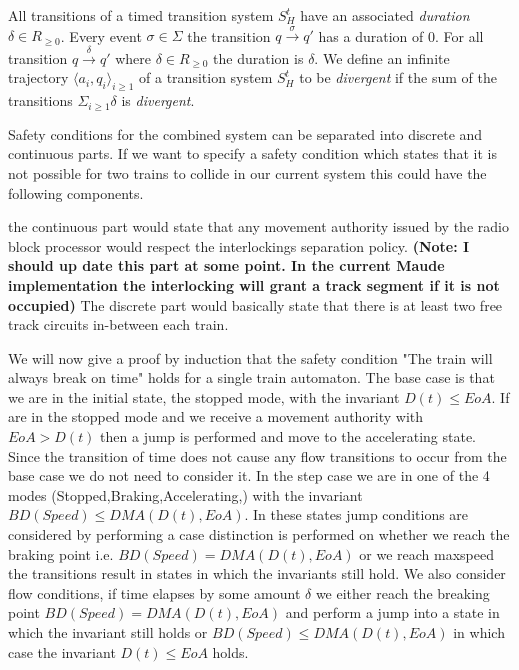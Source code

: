 \begin{mydef}
All transitions of a timed transition system $S^t_H$ have an associated \emph{duration} $\delta \in R_{\geq 0}$. Every event $\sigma \in \Sigma$ the transition $q \xrightarrow{\sigma} q'$ has a duration of 0. For all transition $q \xrightarrow{\delta} q'$ where $\delta \in R_{\geq 0}$ the duration is $\delta$.  We define an infinite trajectory $\langle a_i, q_i \rangle_{i \geq 1}$ of a transition system $S^t_H$ to be \emph{divergent} if the sum of the transitions $\Sigma_{i \geq 1} \delta$ is \emph{divergent}.
 \end{mydef}

Safety conditions for the combined system can be separated into discrete and continuous parts.  If we want to specify a safety condition which states that it is not possible for two trains to collide in our current system this could have the following components. 

the continuous part would state that any movement authority issued by the radio block processor would respect the interlockings separation policy. \textbf{(Note: I should up date this part at some point. In the current Maude implementation the interlocking will grant a track segment if it is not occupied)} The discrete part would basically state that there is at least two free track circuits in-between each train.


We will now give a proof by induction that the safety condition "The train will always break on time" holds for a single train automaton.
The base case is that we are in the initial state, the stopped mode, with the invariant $D(t) \leq EoA$. If are in the stopped mode and we receive a movement authority with $EoA > D(t)$ then a jump is performed and move to the accelerating state. Since the transition of time does not cause any flow transitions to occur from the base case we do not need to consider it. In the step case we are in one of the 4 modes (Stopped,Braking,Accelerating,) with the invariant $BD(Speed) \leq DMA(D(t), EoA)$. In these states jump conditions are considered by performing a case distinction is performed on whether we reach the braking point i.e. $BD(Speed) = DMA(D(t), EoA)$ or we reach maxspeed the transitions result in states in which the invariants still hold. We also consider flow conditions, if time elapses by some amount $\delta$ we either reach the breaking point $BD(Speed) = DMA(D(t), EoA)$ and perform a jump into a state in which the invariant still holds or $BD(Speed) \leq DMA(D(t), EoA)$ in which case the invariant $D(t) \leq EoA$ holds. 

